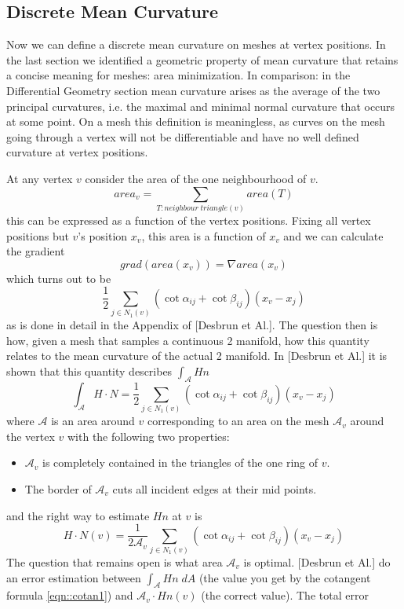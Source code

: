 \subsection{Discrete Mean Curvature}

Now we can define a discrete mean curvature on meshes at vertex positions. In the last section we identified a geometric property of mean curvature that retains a concise meaning for meshes: area minimization. In comparison: in the Differential Geometry section mean curvature arises as the average of the two principal curvatures, i.e. the maximal and minimal normal curvature that occurs at some point. On a mesh this definition is meaningless, as curves on the mesh going through a vertex will not be differentiable and have no well defined curvature at vertex positions.

At any vertex $v$ consider the area of the one neighbourhood of $v$.
\[area_{v}= \sum_{T:neighbour\;triangle (v)} area(T)\]
this can be expressed as a function of the vertex positions. Fixing all vertex positions but $v$'s position $x_v$, this area is a function of $x_v$ and we can calculate the gradient
\[grad(area(x_v)) = \nabla area(x_v)\]
which turns out to be
\begin{equation}\frac{1}{2}\sum_{j\in N_1(v)} (\cot \alpha_{ij} + \cot \beta_{ij})(x_v-x_j) \label{eqn::cotan1}\end{equation}
as is done in detail in the Appendix of [Desbrun et Al.]. The question then is how, given a  mesh that samples a continuous 2 manifold, how this quantity relates to the mean curvature of the actual 2 manifold. In [Desbrun et Al.] it is shown that this quantity describes $\int_{\mathcal A} Hn$
\[\int_{\mathcal A} H\cdot N = \frac{1}{2}\sum_{j\in N_1(v)} (\cot \alpha_{ij} + \cot \beta_{ij})(x_v-x_j)\]
where $\mathcal A$ is an area around $v$ corresponding to an area on the mesh $\mathcal A_v$ around the vertex $v$ with the following two properties:
\begin{itemize}
\item $\mathcal A_v$ is completely contained in the triangles of the one ring of $v$.
\item The border of $\mathcal A_v$ cuts all incident edges at their mid points.
\end{itemize}
and the right way to estimate $Hn$ at $v$ is
\[H\cdot N (v) = \frac{1}{2\mathcal A_v}\sum_{j\in N_1(v)} (\cot \alpha_{ij} + \cot \beta_{ij})(x_v-x_j)\] 
The question that remains open is what area $\mathcal A_v$ is optimal. [Desbrun et Al.] do an error estimation between $\int_{\mathcal A} Hn\; dA$ (the value you get by the cotangent formula \ref{eqn::cotan1}) and $\mathcal A_v \cdot Hn(v)$ (the correct value). The total error
